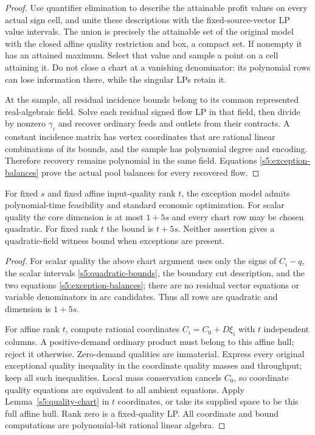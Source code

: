 \begin{proof}
Use quantifier elimination to describe the attainable profit values
on every actual sign cell, and unite these descriptions with the
fixed-source-vector LP value intervals. The union is precisely the
attainable set of the original model with the closed affine quality
restriction and box, a compact set. If nonempty it has an attained
maximum. Select that value and sample a point on a cell attaining it.
Do not close a chart at a vanishing denominator: its polynomial rows
can lose information there, while the singular LPs retain it.

At the sample, all residual incidence bounds belong to its common
represented real-algebraic field. Solve each residual signed flow LP
in that field, then divide by nonzero $\gamma_i$ and recover ordinary
feeds and outlets from their contracts. A constant incidence matrix
has vertex coordinates that are rational linear combinations of its
bounds, and the sample has polynomial degree and encoding. Therefore
recovery remains polynomial in the same field. Equations
\eqref{s5:exception-balances} prove the actual pool balances for every
recovered flow.
\end{proof}

\begin{corollary}\label{s5:fixed-rank}
For fixed $s$ and fixed affine input-quality rank $t$, the exception
model admits polynomial-time feasibility and standard economic
optimization. For scalar quality the core dimension is at most $1+5s$
and every chart row may be chosen quadratic. For fixed rank $t$ the
bound is $t+5s$. Neither assertion gives a quadratic-field witness
bound when exceptions are present.
\end{corollary}
\begin{proof}
For scalar quality the above chart argument uses only the signs of
$C_i-q$, the scalar intervals \eqref{s5:quadratic-bounds}, the boundary
cut description, and the two equations
\eqref{s5:exception-balances}; there are no residual vector equations
or variable denominators in arc candidates. Thus all rows are quadratic
and dimension is $1+5s$.

For affine rank $t$, compute rational coordinates
$C_i=C_0+D\xi_i$ with $t$ independent columns. A positive-demand
ordinary product must belong to this affine hull; reject it otherwise.
Zero-demand qualities are immaterial. Express every original exceptional
quality inequality in the coordinate quality masses and throughput;
keep all such inequalities. Local mass conservation cancels $C_0$, so
coordinate quality equations are equivalent to all ambient equations.
Apply Lemma~\ref{s5:quality-chart} in $t$ coordinates, or take its
supplied space to be this full affine hull. Rank zero is a fixed-quality
LP. All coordinate and bound computations are polynomial-bit rational
linear algebra.
\end{proof}

